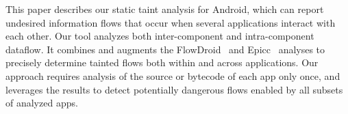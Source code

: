 
This paper describes our static taint analysis for Android, which can
report undesired information flows that occur when several
 applications interact with each other. Our tool
analyzes both inter-component and intra-component dataflow. 
It combines and augments the
FlowDroid~\cite{FlowDroid-PLDI-2014} and Epicc~\cite{octeau2013effective}
analyses to precisely determine tainted flows both within and across applications.
Our approach requires analysis of the source
or bytecode of each app only once, and leverages the results to
detect potentially dangerous flows 
enabled by all subsets of analyzed apps.





